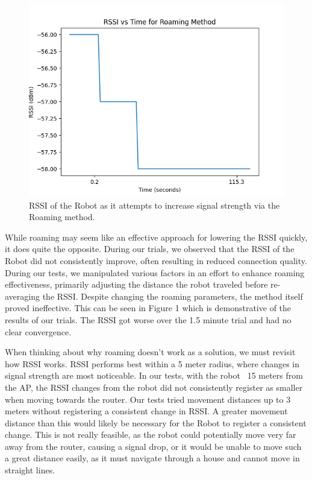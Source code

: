 \begin{figure}[tp]
\centering
\includegraphics[scale=0.5]{figures/rssi_roaming}
\caption{RSSI of the Robot as it attempts to increase signal strength via the Roaming method. }
\end{figure}

While roaming may seem like an effective approach for lowering the RSSI quickly, it does quite the opposite. During our trials, we observed that the RSSI of the Robot did not consistently improve, often resulting in reduced connection quality. During our tests, we manipulated various factors in an effort to enhance roaming effectiveness, primarily adjusting the distance the robot traveled before re-averaging the RSSI. Despite changing the roaming parameters, the method itself proved ineffective. This can be seen in Figure 1 which is demonstrative of the results of our trials. The RSSI got worse over the 1.5 minute trial and had no clear convergence. 

When thinking about why roaming doesn’t work as a solution, we must revisit how RSSI works. RSSI performs best within a 5 meter radius, where changes in signal strength are most noticeable. In our tests, with the robot ~15 meters from the AP, the RSSI changes from the robot did not consistently register as smaller when moving towards the router. Our tests tried movement distances up to 3 meters without registering a consistent change in RSSI. A greater movement distance than this would likely be necessary for the Robot to register a consistent change. This is not really feasible, as the robot could potentially move very far away from the router, causing a signal drop, or it would be unable to move such a great distance easily, as it must navigate through a house and cannot move in straight lines.
